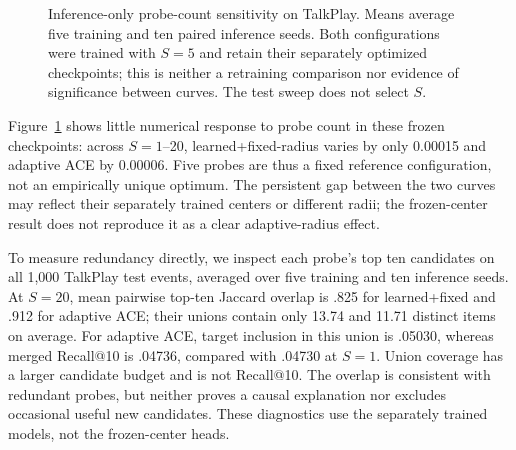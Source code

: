 \documentclass[runningheads]{llncs}
\newcommand{\method}{\textsc{ACE}}
\begin{document}
\begin{figure}[t]
\centering
{}
\caption{Inference-only probe-count sensitivity on TalkPlay. Means average
five training and ten paired inference seeds. Both configurations were trained
with $S=5$ and retain their separately optimized checkpoints; this is neither
a retraining comparison nor evidence of significance between curves.
The test sweep does not select $S$.}
\label{fig:direction-sensitivity}
\end{figure}

Figure~\ref{fig:direction-sensitivity} shows little numerical response to probe
count in these frozen checkpoints: across $S=1$--20, learned+fixed-radius varies
by only 0.00015 and adaptive \method{} by 0.00006. Five probes are thus a fixed
reference configuration, not an empirically unique optimum. The persistent gap
between the two curves may reflect their separately trained centers or
different radii; the frozen-center result does not reproduce it as a clear
adaptive-radius effect.

To measure redundancy directly, we inspect each probe's top ten candidates on
all 1,000 TalkPlay test events, averaged over five training and ten inference
seeds. At $S=20$, mean pairwise top-ten Jaccard overlap is .825 for learned+fixed
and .912 for adaptive \method{}; their unions contain only 13.74 and 11.71
distinct items on average. For adaptive \method{}, target inclusion in this
union is .05030, whereas merged Recall@10 is .04736, compared with .04730 at
$S=1$. Union coverage has a larger candidate budget and is not Recall@10.
The overlap is consistent with redundant probes, but neither proves a causal
explanation nor excludes occasional useful new candidates. These diagnostics
use the separately trained models, not the frozen-center heads.
\end{document}

